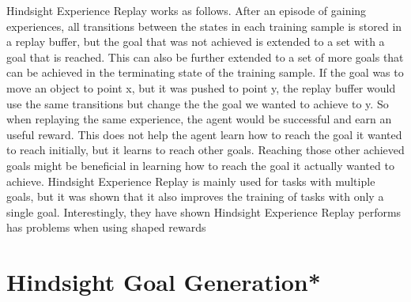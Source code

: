 Hindsight Experience Replay works as follows. After an episode of gaining experiences, all transitions between the states in each training sample is stored in a replay buffer, but the goal that was not achieved is extended to a set with a goal that is reached. This can also be further extended to a set of more goals that can be achieved in the terminating state of the training sample. If the goal was to move an object to point x, but it was pushed to point y, the replay buffer would use the same transitions but change the the goal we wanted to achieve to y. So when replaying the same experience, the agent would be successful and earn an useful reward. This does not help the agent learn how to reach the goal it wanted to reach initially, but it learns to reach other goals. Reaching those other achieved goals might be beneficial in learning how to reach the goal it actually wanted to achieve. Hindsight Experience Replay is mainly used for tasks with multiple goals, but it was shown that it also improves the training of tasks with only a single goal. 
Interestingly, they have shown Hindsight Experience Replay performs has problems when using shaped rewards
 



\section{Hindsight Goal Generation*}


